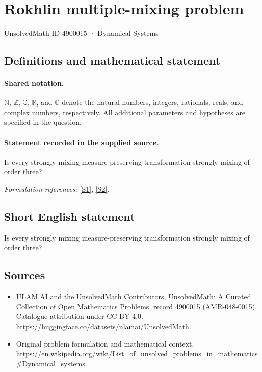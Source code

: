 \documentclass[11pt]{article}
\newcommand{\sref}[2]{\hyperlink{source:#1:#2}{[S#2]}}
\begin{document}
\setcounter{section}{4900014}
\section{Rokhlin multiple-mixing problem}\label{4900015}
{\small UnsolvedMath ID 4900015 · Dynamical Systems}
\subsection{Definitions and mathematical statement}

\paragraph{Shared notation.}$\mathbb N$, $\mathbb Z$, $\mathbb Q$, $\mathbb R$, and $\mathbb C$ denote the natural numbers, integers, rationals, reals, and complex numbers, respectively. All additional parameters and hypotheses are specified in the question.


\paragraph{Statement recorded in the supplied source.}
Is every strongly mixing measure-preserving transformation strongly mixing of order three?
\par\smallskip\textit{Formulation references:} \sref{4900015}{1}, \sref{4900015}{2}.
\subsection{Short English statement}
Is every strongly mixing measure-preserving transformation strongly mixing of order three?
\subsection{Sources}
\begin{itemize}
\item[\hypertarget{source:4900015:1}{S1}] ULAM.AI and the UnsolvedMath Contributors, UnsolvedMath: A Curated Collection of Open Mathematics Problems, record 4900015 (AMR-048-0015). Catalogue attribution under CC BY 4.0.
\url{https://huggingface.co/datasets/ulamai/UnsolvedMath}.
\item[\hypertarget{source:4900015:2}{S2}] Original problem formulation and mathematical context.
\url{https://en.wikipedia.org/wiki/List_of_unsolved_problems_in_mathematics#Dynamical_systems}.
\end{itemize}
\label{end:4900015}
\end{document}
